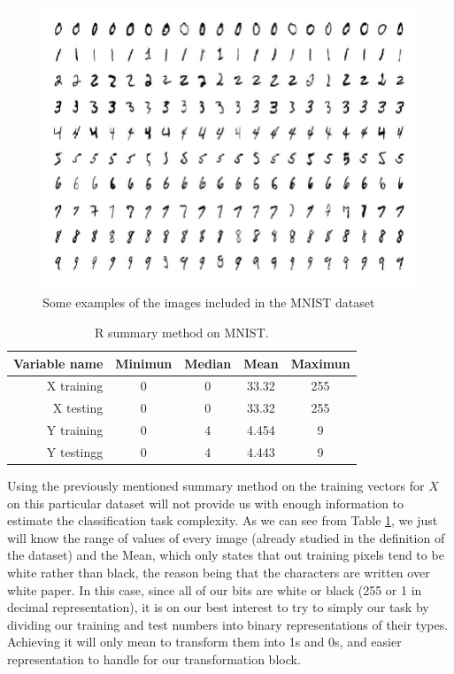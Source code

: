 \begin{figure}[H]
\centering
  \includegraphics[width=16cm]{Figuras_tfg/Figure_MNIST}
  \caption{Some examples of the images included in the MNIST dataset}
 \label{fig:figure_MNIST}
\end{figure}

\begin{table}[H]
	\caption{R summary method on MNIST.}
	\begin{center}
		\label{tab:table_MNIST}
		\begin{tabular}{r|c|c|c|c} %
			\textbf{Variable name} & \textbf{Minimun} & \textbf{Median} & \textbf{Mean} & \textbf{Maximun}\\
			\hline
			X training & 0 & 0 & 33.32 & 255 \\
			X testing  & 0 & 0 & 33.32 & 255 \\
		    Y training & 0 & 4 & 4.454 & 9 \\
		    Y testingg & 0 & 4 & 4.443 & 9 \\
		\end{tabular}
	\end{center}
\end{table}

Using the previously mentioned summary method on the training vectors for $X$ on this particular dataset will not provide us with enough information to estimate the classification task complexity. As we can see from Table \ref{tab:table_MNIST}, we just will know the range of values of every image (already studied in the definition of the dataset) and the Mean, which only states that out training pixels tend to be white rather than black, the reason being that the characters are written over white paper. In this case, since all of our bits are white or black (255 or 1 in decimal representation), it is on our best interest to try to simply our task by dividing our training and test numbers into binary representations of their types. Achieving it will only mean to transform them into 1s and 0s, and easier representation to handle for our transformation block. \par 

